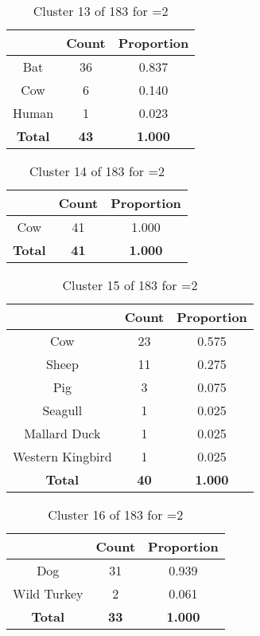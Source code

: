 \begin{table}[ht!]
\centering
\begin{tabular}{|c|c|c|}
\hline
\bf \Spec{} &\bf Count &\bf Proportion\\ \hline \hline
Bat & 36 & 0.837\\ \hline
Cow & 6 & 0.140\\ \hline
Human & 1 & 0.023\\ \hline
\hline
\bf Total & \bf 43 & \bf 1.000\\ \hline
\end{tabular}
\label{tab:cluster:13:2}
\caption{Cluster 13 of 183 for \minneigh{}=2}
\end{table}

\begin{table}[ht!]
\centering
\begin{tabular}{|c|c|c|}
\hline
\bf \Spec{} &\bf Count &\bf Proportion\\ \hline \hline
Cow & 41 & 1.000\\ \hline
\hline
\bf Total & \bf 41 & \bf 1.000\\ \hline
\end{tabular}
\label{tab:cluster:14:2}
\caption{Cluster 14 of 183 for \minneigh{}=2}
\end{table}

\begin{table}[ht!]
\centering
\begin{tabular}{|c|c|c|}
\hline
\bf \Spec{} &\bf Count &\bf Proportion\\ \hline \hline
Cow & 23 & 0.575\\ \hline
Sheep & 11 & 0.275\\ \hline
Pig & 3 & 0.075\\ \hline
Seagull & 1 & 0.025\\ \hline
Mallard Duck & 1 & 0.025\\ \hline
Western Kingbird & 1 & 0.025\\ \hline
\hline
\bf Total & \bf 40 & \bf 1.000\\ \hline
\end{tabular}
\label{tab:cluster:15:2}
\caption{Cluster 15 of 183 for \minneigh{}=2}
\end{table}

\begin{table}[ht!]
\centering
\begin{tabular}{|c|c|c|}
\hline
\bf \Spec{} &\bf Count &\bf Proportion\\ \hline \hline
Dog & 31 & 0.939\\ \hline
Wild Turkey & 2 & 0.061\\ \hline
\hline
\bf Total & \bf 33 & \bf 1.000\\ \hline
\end{tabular}
\label{tab:cluster:16:2}
\caption{Cluster 16 of 183 for \minneigh{}=2}
\end{table}

